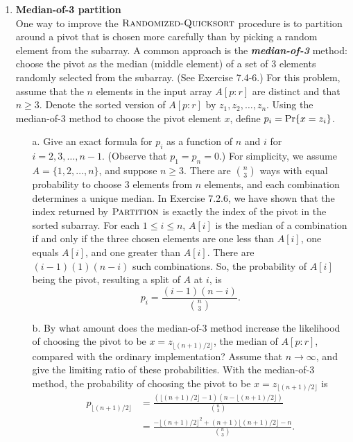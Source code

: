 \documentclass[12pt,reqno]{amsart}
\newif\ifanswer
\begin{document}
\begin{enumerate}[1.]
\item \textbf{Median-of-3 partition}\\ One way to improve the $\textsc{Randomized-Quicksort}$ procedure is to partition around a pivot that is chosen more carefully than by picking a random element from the subarray. A common approach is the \textit{\textbf{median-of-3}} method: choose the pivot as the median (middle element) of a set of $3$ elements randomly selected from the subarray. (See Exercise 7.4-6.) For this problem, assume that the $n$ elements in the input array $A[p: r]$ are distinct and that $n \geq 3$. Denote the sorted version of $A[p: r]$ by $z_1, z_2, \dots, z_n$. Using the median-of-3 method to choose the pivot element $x$, define $p_i = \textup{Pr}\{x = z_i\}$.
\begin{enumerate}
    \item[a.] Give an exact formula for $p_i$ as a function of $n$ and $i$ for $i = 2, 3, \dots, n - 1$. (Observe that $p_1 = p_n = 0$.)
    \ifanswer
    \noindent {\bf \\Solution}
    For simplicity, we assume $A = \{1, 2, \dots, n\}$, and suppose $n\geq 3$. There are $\binom{n}{3}$ ways with equal probability to choose $3$ elements from $n$ elements, and each combination determines a unique median. In Exercise 7.2.6, we have shown that the index returned by $\textsc{Partition}$ is exactly the index of the pivot in the sorted subarray. For each $1\leq i \leq n$, $A[i]$ is the median of a combination if and only if the three chosen elements are one less than $A[i]$, one equals $A[i]$, and one greater than $A[i]$. There are $(i - 1)(1)(n - i)$ such combinations. So, the probability of $A[i]$ being the pivot, resulting a split of $A$ at $i$, is
    $$
    p_i = \frac{(i - 1)(n - i)}{\binom{n}{3}}.
    $$
    \item[b.] By what amount does the median-of-3 method increase the likelihood of choosing the pivot to be $x = z_{\lfloor(n + 1)/2\rfloor}$, the median of $A[p: r]$, compared with the ordinary implementation? Assume that $n\to\infty$, and give the limiting ratio of these probabilities.
    \ifanswer
    \noindent {\bf \\Solution}
    With the median-of-3 method, the probability of choosing the pivot to be $x = z_{\lfloor(n + 1)/2\rfloor}$ is
    \begin{align*}
    p_{\lfloor(n + 1)/2\rfloor} &= \frac{({\lfloor(n + 1)/2\rfloor} - 1)(n - {\lfloor(n + 1)/2\rfloor})}{\binom{n}{3}}\\
    &= \frac{-\lfloor(n + 1)/2\rfloor^2 + (n + 1)\lfloor(n + 1)/2\rfloor - n}{\binom{n}{3}}.

\end{align*}
\end{enumerate}
\end{enumerate}
\end{document}
